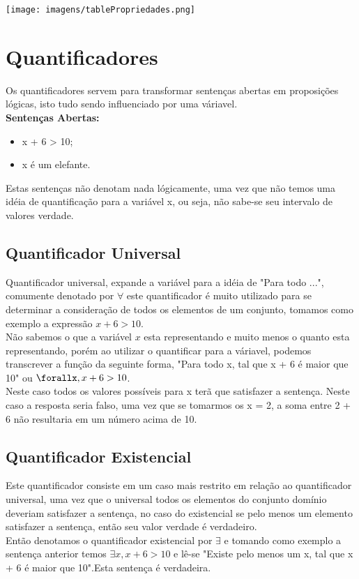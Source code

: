 \documentclass[a4paper,12pt,twoside,BCOR=10mm]{scrbook}
\begin{document}
\begin{titlepage}
\begin{center}
\texttt{[image: imagens/tablePropriedades.png]}
\end{center}

\section{Quantificadores}
Os quantificadores servem para transformar sentenças abertas em proposições lógicas, isto tudo sendo influenciado por uma váriavel.
\\
\textbf{Sentenças Abertas:}
\\
\begin{itemize}
\item x + 6 > 10;
\item x é um elefante.
\end{itemize}
Estas sentenças não denotam nada lógicamente, uma vez que não temos uma idéia de quantificação para a variável x, ou seja, não sabe-se seu intervalo de valores verdade.

\subsection{Quantificador Universal}
Quantificador universal, expande a variável para a idéia de "Para todo ...", comumente denotado por $\forall$ este quantificador é muito utilizado para se determinar a consideração de todos os elementos de um conjunto, tomamos como exemplo a expressão $x + 6 > 10$.\\ 
Não sabemos o que a variável $x$ esta representando e muito menos o quanto esta representando, porém ao utilizar o quantificar para a váriavel, podemos transcrever a função da seguinte forma, "Para todo x, tal que x + 6 é maior que 10" ou $\forallx, x + 6 > 10$.\\
Neste caso todos os valores possíveis para x terã que satisfazer a sentença. Neste caso a resposta seria falso, uma vez que se tomarmos os x = 2, a soma entre 2 + 6 não resultaria em um número acima de 10.


\subsection{Quantificador Existencial}
Este quantificador consiste em um caso mais restrito em relação ao quantificador universal, uma vez que o universal todos os elementos do conjunto domínio deveriam satisfazer a sentença, no caso do existencial se pelo menos um elemento satisfazer a sentença, então seu valor verdade é verdadeiro.\\
Então denotamos o quantificador existencial por $\exists$ e tomando como exemplo a sentença anterior temos $\exists x, x + 6 > 10$ e lê-se "Existe pelo menos um x, tal que x + 6 é maior que 10".Esta sentença é verdadeira.


\end{titlepage}
\end{document}
